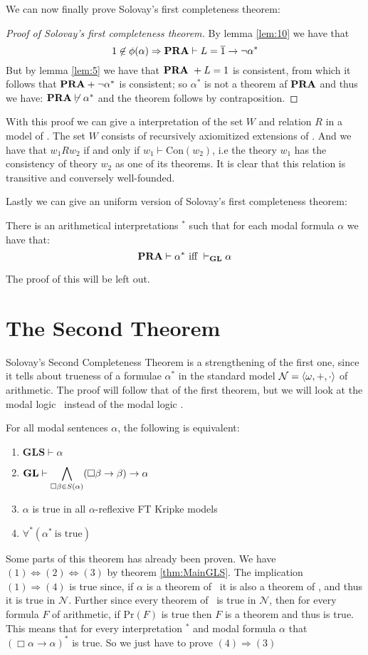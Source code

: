 \documentclass[../main.tex]{subfiles}
\begin{document}
We can now finally prove Solovay's first completeness theorem:
\begin{proof}[Proof of Solovay's first completeness theorem]
	By lemma \ref{lem:10} we have that
	\[1\not\in\phi(\alpha)\Rightarrow\text{\textbf{PRA}}\vdash L=\overline
	1\rightarrow\neg\alpha^*\]
	But by lemma \ref{lem:5} we have that $\text{\textbf{PRA}}\ +L=1$ is consistent, from
	which it follows that $\text{\textbf{PRA}}+\neg\alpha^*$ is consistent; so $\alpha^*$
	is not a theorem af $\text{\textbf{PRA}}$ and thus we have:
	$\text{\textbf{PRA}}\not\vdash\alpha^*$ and the theorem follows by contraposition.
\end{proof}

With this proof we can give a interpretation of the set $W$ and relation $R$ in
a model of \GL. The set $W$ consists of recursively axiomitized extensions of
\PRA. And we have that $w_1Rw_2$ if and only if $w_1\vdash\text{Con}(w_2)$,
i.e the theory $w_1$ has the consistency of theory $w_2$ as one of its
theorems. It is clear that this relation is transitive and conversely
well-founded.

Lastly we can give an uniform version of Solovay's first completeness theorem:
\begin{thm}
	There is an arithmetical interpretations $^*$ such that for each modal
	formula $\alpha$ we have that:
	\[\PRA\vdash\alpha^*\ \text{iff}\ \vdash_\GL\alpha\]
\end{thm}
The proof of this will be left out.
\section{The Second Theorem}
\label{chap:second}
Solovay's Second Completeness Theorem is a strengthening of the first one,
since it tells about trueness of a formulae $\alpha^*$ in the standard model
$\mathcal{N}=\langle
\omega,+,\cdot\rangle$ of arithmetic. The proof will follow that of the first
theorem, but we will look at the modal logic \GLS\ instead of the modal logic
\GL.
\begin{thm}
	For all modal sentences $\alpha$, the following is equivalent:
	\begin{enumerate}
		\item $\textbf{GLS}\vdash\alpha$
		\item $\text{\textbf{GL}}\vdash\displaystyle\bigwedge_{\Box \beta\in
			S(\alpha)}(\Box\beta\rightarrow\beta)\rightarrow\alpha$
		\item $\alpha$ is true in all $\alpha$-reflexive FT Kripke models
		\item $\forall^*(\alpha^*\ \text{is true})$
	\end{enumerate}
\end{thm}
Some parts of this theorem has already been proven. We have
$(1)\Leftrightarrow(2)\Leftrightarrow(3)$ by theorem \ref{thm:MainGLS}. The
implication $(1)\Rightarrow(4)$ is true since, if $\alpha$ is a theorem of \GL\
it is also a theorem of \PRA, and thus it is true in $\mathcal{N}$. Further
since every theorem of \PRA\ is true in $\mathcal{N}$, then for every formula $F$ of
arithmetic, if $\text{Pr}(F)$ is true then $F$ is a theorem and thus is true.
This means that for every interpretation $^*$ and modal formula $\alpha$ that
$(\Box\alpha\rightarrow\alpha)^*$ is true. So we just have to prove
$(4)\Rightarrow(3)$
\end{document}
